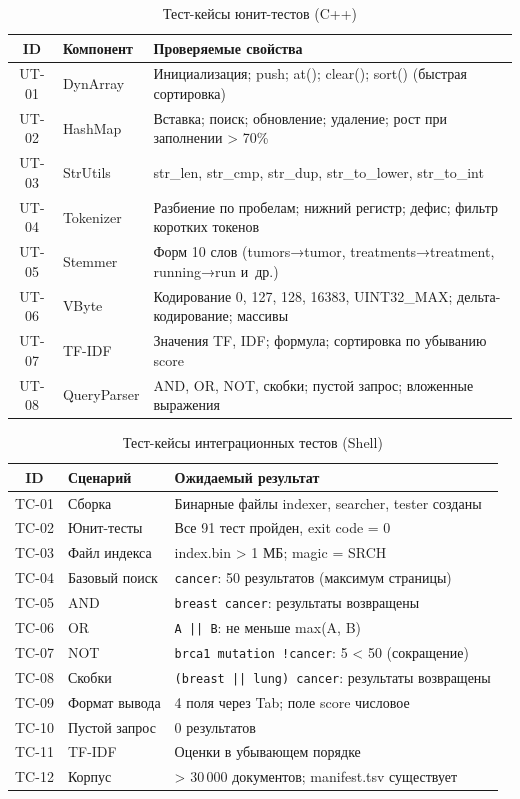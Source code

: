 \documentclass[a4paper,12pt]{article}
\begin{document}
\begin{table}[H]
\centering
\caption{Тест-кейсы юнит-тестов (C++)}
\begin{tabular}{clp{6.5cm}}
\toprule
\textbf{ID} & \textbf{Компонент} & \textbf{Проверяемые свойства} \\
\midrule
UT-01 & DynArray  & Инициализация; push; at(); clear(); sort() (быстрая сортировка) \\
UT-02 & HashMap   & Вставка; поиск; обновление; удаление; рост при заполнении > 70\% \\
UT-03 & StrUtils  & str\_len, str\_cmp, str\_dup, str\_to\_lower, str\_to\_int \\
UT-04 & Tokenizer & Разбиение по пробелам; нижний регистр; дефис; фильтр коротких токенов \\
UT-05 & Stemmer   & Форм 10 слов (tumors→tumor, treatments→treatment, running→run и~др.) \\
UT-06 & VByte     & Кодирование 0, 127, 128, 16383, UINT32\_MAX; дельта-кодирование; массивы \\
UT-07 & TF-IDF    & Значения TF, IDF; формула; сортировка по убыванию score \\
UT-08 & QueryParser & AND, OR, NOT, скобки; пустой запрос; вложенные выражения \\
\bottomrule
\end{tabular}
\end{table}

\begin{table}[H]
\centering
\caption{Тест-кейсы интеграционных тестов (Shell)}
\begin{tabular}{clp{6.5cm}}
\toprule
\textbf{ID} & \textbf{Сценарий} & \textbf{Ожидаемый результат} \\
\midrule
TC-01 & Сборка        & Бинарные файлы indexer, searcher, tester созданы \\
TC-02 & Юнит-тесты    & Все 91 тест пройден, exit code = 0 \\
TC-03 & Файл индекса  & index.bin > 1 МБ; magic = SRCH \\
TC-04 & Базовый поиск & \texttt{cancer}: 50 результатов (максимум страницы) \\
TC-05 & AND           & \texttt{breast cancer}: результаты возвращены \\
TC-06 & OR            & \texttt{A || B}: не меньше max(A, B) \\
TC-07 & NOT           & \texttt{brca1 mutation !cancer}: 5 < 50 (сокращение) \\
TC-08 & Скобки        & \texttt{(breast || lung) cancer}: результаты возвращены \\
TC-09 & Формат вывода & 4 поля через Tab; поле score числовое \\
TC-10 & Пустой запрос & 0 результатов \\
TC-11 & TF-IDF        & Оценки в убывающем порядке \\
TC-12 & Корпус        & > 30\,000 документов; manifest.tsv существует \\
\bottomrule
\end{tabular}
\end{table}
\end{document}
